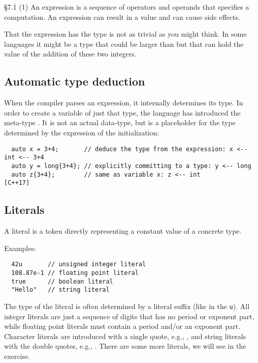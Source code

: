 \begin{standard}{\S 7.1 (1)}
  An expression is a sequence of operators and operands that specifies a computation. An expression can result in a value and can cause side effects.
\end{standard}

\begin{rem}
  That the expression  has the type  is not as trivial as you might think. In some languages it might be a type that could be larger than  but that can hold the value of the addition of these two integers.
\end{rem}


\subsection{Automatic type deduction}
When the compiler parses an expression, it internally determines its type. In order to create a variable of just that type, the language has introduced the meta-type . It is not an actual data-type, but is a placeholder for the type determined by the expression of the
initialization:
%
\begin{verbatim}
  auto x = 3+4;       // deduce the type from the expression: x <-- int <-- 3+4
  auto y = long{3+4}; // explicitly committing to a type: y <-- long
  auto z{3+4};        // same as variable x: z <-- int                  [C++17]
\end{verbatim}

\subsection{Literals\label{sec:literal}}
A literal is a token directly representing a constant value of a concrete type.

Examples:
\begin{verbatim}
  42u       // unsigned integer literal
  108.87e-1 // floating point literal
  true      // boolean literal
  "Hello"   // string literal
\end{verbatim}

The type of the literal is often determined by a literal suffix (like in  the \texttt{u}). All integer literals are just a sequence of digits that has no period or exponent part, while floating point literals must contain a period and/or an exponent part. Character literals are introduced with a single quote, e.g., , and string literals with the double quotes, e.g., . There are some more literals, we will see in the exercise.

